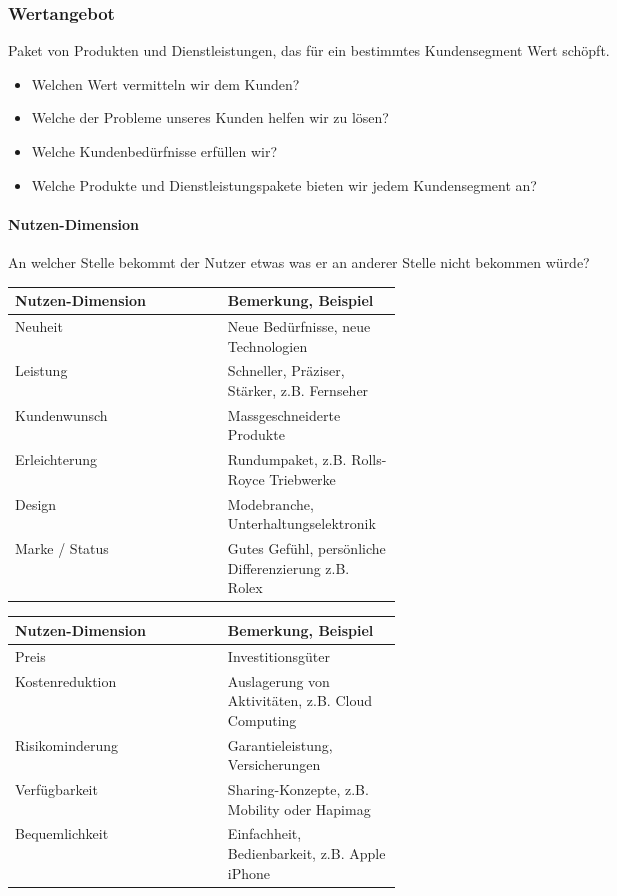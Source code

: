 \subsubsection{Wertangebot}
Paket von Produkten und Dienstleistungen, das für ein bestimmtes Kundensegment Wert schöpft.
\begin{itemize}
	\item Welchen Wert vermitteln wir dem Kunden?
	\item Welche der Probleme unseres Kunden helfen wir zu lösen?
	\item Welche Kundenbedürfnisse erfüllen wir?
	\item Welche Produkte und Dienstleistungspakete bieten wir jedem Kundensegment an?
\end{itemize}

\paragraph{Nutzen-Dimension}
An welcher Stelle bekommt der Nutzer etwas was er an anderer Stelle nicht bekommen würde? \\
\begin{multicols}{2}
	\begin{tabular}{|l|p{0.45\linewidth}|}
		\hline 
		\textbf{Nutzen-Dimension} & \textbf{Bemerkung, Beispiel}\\ \hline
		Neuheit & Neue Bedürfnisse, neue Technologien\\ \hline
		Leistung & Schneller, Präziser, Stärker, z.B. Fernseher\\ \hline
		Kundenwunsch & Massgeschneiderte Produkte\\ \hline
		Erleichterung & Rundumpaket, z.B. Rolls-Royce Triebwerke\\ \hline
		Design & Modebranche, Unterhaltungselektronik\\ \hline
		Marke / Status & Gutes Gefühl, persönliche Differenzierung z.B. Rolex\\ \hline
	\end{tabular} 

	\begin{tabular}{|l|p{0.45\linewidth}|}
		\hline 
		\textbf{Nutzen-Dimension} & \textbf{Bemerkung, Beispiel}\\ \hline		
		Preis & Investitionsgüter\\ \hline
		Kostenreduktion & Auslagerung von Aktivitäten, z.B. Cloud Computing\\ \hline
		Risikominderung & Garantieleistung, Versicherungen\\ \hline
		Verfügbarkeit & Sharing-Konzepte, z.B. Mobility oder Hapimag\\ \hline
		Bequemlichkeit & Einfachheit, Bedienbarkeit, z.B. Apple iPhone \\ \hline
	\end{tabular} 	
\end{multicols}

